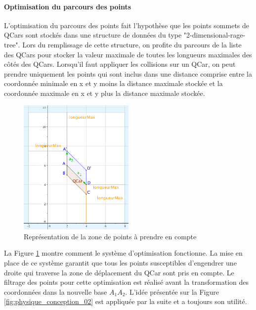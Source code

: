 \documentclass[a4paper, 12pt]{article}
\begin{document}
\paragraph{Optimisation du parcours des points}
L'optimisation du parcours des points fait l'hypothèse que les points sommets de QCars sont stockés dans une structure de données du type "2-dimensional-rage-tree". Lors du remplissage de cette structure, on profite du parcours de la liste des QCars pour stocker la valeur maximale de toutes les longueurs maximales des côtés des QCars. Lorsqu'il faut appliquer les collisions sur un QCar, on peut prendre uniquement les points qui sont inclus dans une distance comprise entre la coordonnée minimale en x et y moins la distance maximale stockée et la coordonnée maximale en x et y plus la distance maximale stockée. 
\begin{figure}[H]
 \centering
 \includegraphics[width=0.5\textwidth]{includes/images/physique_conception_03}
 \caption{\label{fig:physique_conception_03}Représentation de la zone de points à prendre en compte}
\end{figure}
La Figure \ref{fig:physique_conception_03} montre comment le système d'optimisation fonctionne. La mise en place de ce système garantit que tous les points susceptibles d'engendrer une droite qui traverse la zone de déplacement du QCar sont pris en compte. Le filtrage des points pour cette optimisation est réalisé avant la transformation des coordonnées dans la nouvelle base $A_1A_2$. L'idée présentée sur la Figure \ref{fig:physique_conception_02} est appliquée par la suite et a toujours son utilité.
\end{document}
